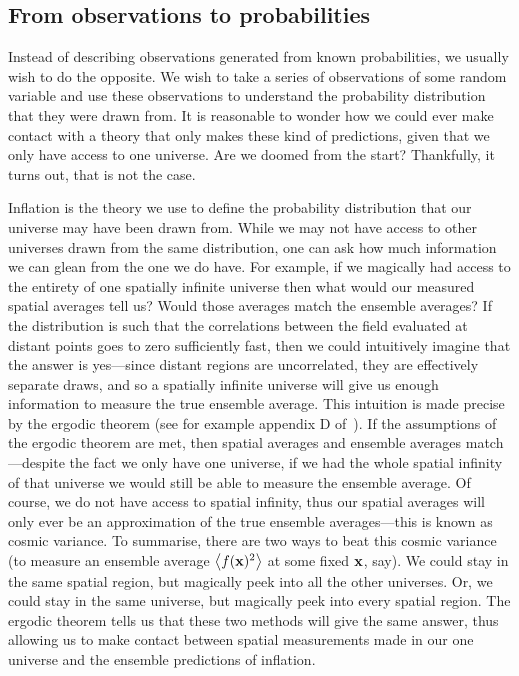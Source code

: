 \subsection{From observations to probabilities}
    Instead of describing observations generated from known probabilities,
    we usually wish to do the opposite.
    We wish to take a series of observations of some random variable and use these observations
    to understand the probability distribution that they were drawn from.
    It is reasonable to wonder how we could ever make contact with a theory
    that only makes these kind of predictions, given that we only have access to one universe.
    Are we doomed from the start? Thankfully, it turns out, that is not the case.


    Inflation is the theory we use to define the probability distribution
    that our universe may have been drawn from.
    While we may not have access to other universes drawn from the same distribution,
    one can ask how much information we can glean from the one we do have.
    For example, if we magically had access to the entirety of one spatially
    infinite universe then what would our measured spatial averages tell us?
    Would those averages match the ensemble averages?
    If the distribution is such that the correlations between the field evaluated at distant
    points goes to zero sufficiently fast, then we could intuitively imagine that the answer is
    yes---since distant regions are uncorrelated, they are effectively separate draws, and
    so a spatially infinite universe will give us enough information to measure the true
    ensemble average. This intuition is made precise by the ergodic theorem
    (see for example appendix D of~\cite{Weinberg_cosmo}).
    If the assumptions of the ergodic theorem are met,
    then spatial averages and ensemble averages
    match---despite the fact we only have one universe,
    if we had the whole spatial infinity of that universe
    we would still be able to measure the ensemble average.
    Of course, we do not have access to spatial infinity,
    thus our spatial averages will only ever be an approximation of the
    true ensemble averages---this is known as cosmic variance.
    To summarise,
    there are two ways to beat this cosmic variance (to measure an ensemble
    average $\left<f(\mathbf{x})^2\right>$ at some fixed $\mathbf{x}$, say).
    We could stay in the same spatial region, but magically peek into all the other universes.
    Or, we could stay in the same universe, but magically peek into every spatial region.
    The ergodic theorem tells us that these two methods will give the same answer,
    thus allowing us to make contact between spatial measurements made in
    our one universe and the ensemble predictions of inflation.


